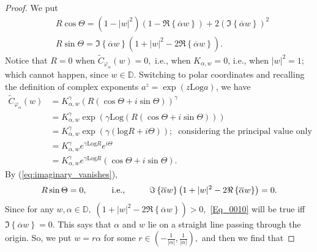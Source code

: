 \documentclass[12pt, reqno]{amsart}
\theoremstyle{definition}
\theoremstyle{remark}
\numberwithin{equation}{section}
\begin{document}
\begin{proof}
 



        
        We put
        \begin{equation*}
        \begin{split}
            &R\cos{\Theta}=\left(1-|w|^2\right)\left(1-\Re\left\{\overline{\alpha}w\right\}\right)+2\left(\Im\left\{\overline{\alpha}w\right\}\right)^2\\
            &R\sin{\Theta}=\Im\left\{\overline{\alpha}w\right\}\left(1+|w|^2-2 \Re\left\{\overline{\alpha}w\right\}\right).
            \end{split}
        \end{equation*}
        Notice that $R=0$ when $\widetilde{C}_{\varphi_\alpha}(w)=0,$ i.e., when $K_{\alpha,w}=0$, i.e., when $|w|^2=1$; which cannot happen, since $w\in \mathbb{D}$. Switching to polar coordinates and recalling the definition of complex exponents $a^z=\exp\left({z\mbox{Log}a}\right)$, we have
        \begin{equation*}
            \begin{split}
                \widetilde{C}_{\varphi_\alpha}(w)&=K_{\alpha,w}^\gamma\left(R(\cos{\Theta}+i\sin{\Theta})\right)^\gamma\\
                &=K_{\alpha,w}^\gamma \exp{\left(\gamma\mbox{Log}\left(R(\cos{\Theta}+i\sin{\Theta})\right)\right)}\\
                &=K_{\alpha,w}^\gamma \exp{\left(\gamma(\mbox{log}R+i\Theta)\right)};\;\;\mbox{considering the principal value only}\\
                &=K_{\alpha,w}^\gamma e^{\gamma\mbox{Log}R}e^{i\Theta}\\
                &=K_{\alpha,w}^\gamma e^{\gamma\mbox{Log}R}(\cos{\Theta}+i\sin{\Theta}).
            \end{split}
        \end{equation*}
       By (\ref{eq:imaginary_vanishes}),
       \begin{equation}\label{Eq_0010}
          R\sin{\Theta}=0,\hspace{1 cm}\mbox{i.e.,}\hspace{1 cm}\Im\left\{\overline{\alpha}w\right\}\left(1+|w|^2-2 \Re\left\{\overline{\alpha}w\right\}\right)=0.
       \end{equation}
       Since for any $w,\alpha\in \mathbb{D},\;\left(1+|w|^2-2 \Re\left\{\overline{\alpha}w\right\}\right)>0,$ \eqref{Eq_0010} will be true iff $\Im\left\{\overline{\alpha}w\right\}=0.$ This says that $\alpha$ and $w$ lie on a straight line passing through the origin. So, we put $w=r\alpha$ for some $r\in \left(-\frac{1}{|\alpha|},\frac{1}{|\alpha|}\right),$ and then we find that

\end{proof}
\end{document}
